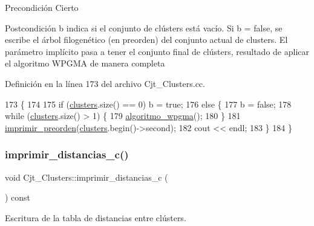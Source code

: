 \begin{DoxyPrecond}{Precondición}
Cierto 
\end{DoxyPrecond}
\begin{DoxyPostcond}{Postcondición}
b indica si el conjunto de clústers está vacío. Si b = false, se escribe el árbol filogenético (en preorden) del conjunto actual de clusters. El parámetro implícito pasa a tener el conjunto final de clústers, resultado de aplicar el algoritmo W\+P\+G\+MA de manera completa 
\end{DoxyPostcond}


Definición en la línea 173 del archivo Cjt\+\_\+\+Clusters.\+cc.


\begin{DoxyCode}
173                                                       \{
174 
175   \textcolor{keywordflow}{if} (\hyperlink{class_cjt___clusters_a866c5a14f8f50598be2af9fd8c115dd2}{clusters}.size() == 0) b = \textcolor{keyword}{true};
176   \textcolor{keywordflow}{else} \{
177     b = \textcolor{keyword}{false};
178     \textcolor{keywordflow}{while} (\hyperlink{class_cjt___clusters_a866c5a14f8f50598be2af9fd8c115dd2}{clusters}.size() > 1) \{
179       \hyperlink{class_cjt___clusters_a04cfe3b7b8998398a48459f9a9339c22}{algoritmo\_wpgma}();
180     \}
181     \hyperlink{_cjt___clusters_8cc_a4afe93558c94b1dce66fff0cf68cb08a}{imprimir\_preorden}(\hyperlink{class_cjt___clusters_a866c5a14f8f50598be2af9fd8c115dd2}{clusters}.begin()->second);
182     cout << endl;
183   \}
184 \}
\end{DoxyCode}
\mbox{\label{class_cjt___clusters_a8caa8d4eae15730feccea2ce7d22a196}} 
\subsubsection{\texorpdfstring{imprimir\+\_\+distancias\+\_\+c()}{imprimir\_distancias\_c()}}
{\footnotesize\ttfamily void Cjt\+\_\+\+Clusters\+::imprimir\+\_\+distancias\+\_\+c (\begin{DoxyParamCaption}{ }\end{DoxyParamCaption}) const}



Escritura de la tabla de distancias entre clústers. 

